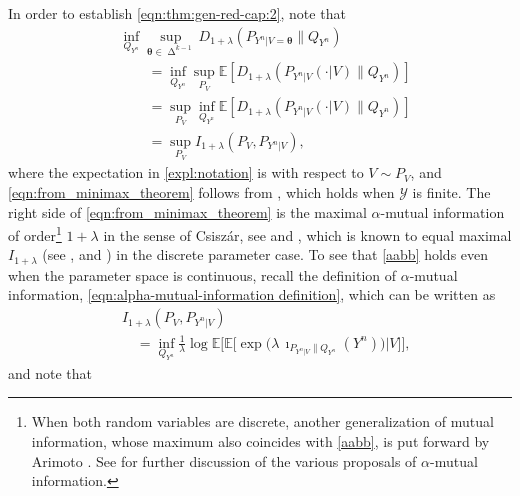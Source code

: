 \documentclass[journal, 10pt]{IEEEtran}
\newcommand{\bbE}{\mathbb{E}}
\newcommand{\cY}{\mathcal{Y}}
\theoremstyle{plain}
\theoremstyle{plain}
\theoremstyle{plain}
\theoremstyle{plain}
\newcommand{\boldtheta}{\mathbold{\theta}}
\newcommand{\simplex}{\operatorname{\Delta}}
\begin{document}
In order to establish \eqref{eqn:thm:gen-red-cap:2}, note that
\begin{align}
&\inf_{Q_{Y^n}}\sup_{\boldtheta\in \simplex^{k-1}}D_{1+\lambda}\left(P_{Y^n|V=\boldtheta}\|Q_{Y^n}\right) \nonumber \\
&\qquad = \inf_{Q_{Y^n}}\sup_{P_V}\bbE \left[  D_{1+\lambda}\left(P_{Y^n|V}(\cdot | V) \|Q_{Y^n}\right) \right] \label{expl:notation} \\
&\qquad = \sup_{P_V}\inf_{Q_{Y^n}} \bbE \left[ D_{1+\lambda}\left(P_{Y^n|V}(\cdot| V) \|Q_{Y^n}\right) \right] \label{eqn:from_minimax_theorem} \\
&\qquad =\sup_{P_V}I_{1+\lambda} (P_V,P_{Y^n|V})\text{,} \label{aabb}
\end{align}
where the expectation in \eqref{expl:notation} is with respect to $V \sim P_V $, and \eqref{eqn:from_minimax_theorem} follows from \cite[Theorem 34]{Erven2014}, which holds when $\cY$ is finite. The right side of \eqref{eqn:from_minimax_theorem} is the maximal $\alpha$-mutual information of order\footnote{When both random variables are discrete, another generalization of mutual information, whose maximum also coincides with \eqref{aabb}, is put forward by Arimoto \cite{arimoto75information}. See \cite{Verdu2015} for further discussion of the various proposals of $\alpha$-mutual information.} $1+\lambda$ in the sense of Csisz\'ar, see \cite{Verdu2015} and \cite{Csiszar95}, which is known to equal maximal $I_{1+\lambda}$ (see \cite[Proposition 1]{Verdu2015}, and \cite[Theorem 5]{Csiszar95}) in the discrete parameter case. To see that \eqref{aabb} holds even when the parameter space is continuous, recall the definition of $\alpha$-mutual information, \eqref{eqn:alpha-mutual-information definition}, which can be written as
\begin{align}
&I_{1+\lambda} (P_V,P_{Y^n|V}) \nonumber  \\ 
&\quad =\inf_{Q_{Y^n} } \frac{1}{\lambda}\log \bbE\bigg[ \bbE \bigg[\exp\big( \lambda\,\imath_{P_{Y^n|V}\|Q_{Y^n}}(Y^n)\big)\big| V  \bigg]  \bigg]\text{,} \label{alternate form for alpha mutual inform}
\end{align}
and note that
\end{document}
